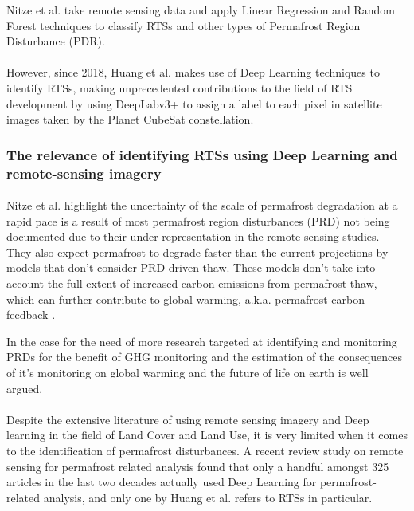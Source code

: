 \documentclass{article}
\begin{document}
Nitze et al. \cite{articleing2018} take remote sensing data and apply Linear Regression and Random Forest techniques to classify RTSs and other types of Permafrost Region Disturbance (PDR).

\paragraph{}
However, since 2018, Huang et al. \cite{HUANG10122067} \cite{HUANG2020111534} \cite{HUANG2021102399} makes use of Deep Learning techniques to identify RTSs, making unprecedented contributions to the field of RTS development by using DeepLabv3+ to assign a label to each pixel in satellite images taken by the Planet CubeSat constellation.

\paragraph{}

\subsubsection{The relevance of identifying RTSs using Deep Learning and remote-sensing imagery}
\paragraph{}

Nitze et al. \cite{articleing2018} highlight the uncertainty of the scale of permafrost degradation at a rapid pace is a result of most permafrost region disturbances (PRD) not being documented due to their under-representation in the remote sensing studies. 
They also expect permafrost to degrade faster than the current projections by models that don't consider PRD-driven thaw. These models don't take into account the full extent of increased carbon emissions from permafrost thaw, which can further contribute to global warming, a.k.a. permafrost carbon feedback \cite{articlecarbonfeedback}.

In \cite{book1} the case for the need of more research targeted at identifying and monitoring PRDs for the benefit of GHG monitoring and the estimation of the consequences of it's monitoring on global warming and the future of life on earth is well argued.

\paragraph{}
Despite the extensive literature of using remote sensing imagery and Deep learning in the field of Land Cover and Land Use, it is very limited when it comes to the identification of permafrost disturbances.
A recent review study on remote sensing for permafrost related analysis \cite{rs13061217} found that only a handful amongst 325 articles in the last two decades actually used Deep Learning for permafrost-related analysis, and only one by Huang et al. \cite{HUANG2020111534} refers to RTSs in particular. 
\end{document}
